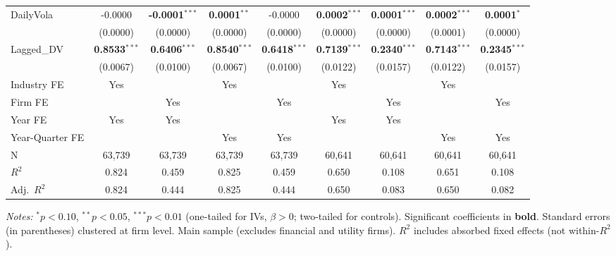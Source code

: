 \begin{landscape}
\begin{table}[H]
\begin{tabular}{lcccccccc}
DailyVola & -0.0000 & \textbf{-0.0001}$^{***}$ & \textbf{0.0001}$^{**}$ & -0.0000 & \textbf{0.0002}$^{***}$ & \textbf{0.0001}$^{***}$ & \textbf{0.0002}$^{***}$ & \textbf{0.0001}$^{*}$ \\
 & (0.0000) & (0.0000) & (0.0000) & (0.0000) & (0.0000) & (0.0000) & (0.0001) & (0.0000) \\
Lagged\_DV & \textbf{0.8533}$^{***}$ & \textbf{0.6406}$^{***}$ & \textbf{0.8540}$^{***}$ & \textbf{0.6418}$^{***}$ & \textbf{0.7139}$^{***}$ & \textbf{0.2340}$^{***}$ & \textbf{0.7143}$^{***}$ & \textbf{0.2345}$^{***}$ \\
 & (0.0067) & (0.0100) & (0.0067) & (0.0100) & (0.0122) & (0.0157) & (0.0122) & (0.0157) \\
\midrule
Industry FE & Yes &  & Yes &  & Yes &  & Yes &  \\
Firm FE &  & Yes &  & Yes &  & Yes &  & Yes \\
Year FE & Yes & Yes &  &  & Yes & Yes &  &  \\
Year-Quarter FE &  &  & Yes & Yes &  &  & Yes & Yes \\
\midrule
N & 63,739 & 63,739 & 63,739 & 63,739 & 60,641 & 60,641 & 60,641 & 60,641 \\
$R^2$ & 0.824 & 0.459 & 0.825 & 0.459 & 0.650 & 0.108 & 0.651 & 0.108 \\
Adj.~$R^2$ & 0.824 & 0.444 & 0.825 & 0.444 & 0.650 & 0.083 & 0.650 & 0.082 \\
\bottomrule
\end{tabular}
\begin{minipage}{\linewidth}
\vspace{2pt}\scriptsize
\textit{Notes:} $^{*}p<0.10$, $^{**}p<0.05$, $^{***}p<0.01$ (one-tailed for IVs, $\beta > 0$; two-tailed for controls).
 Significant coefficients in \textbf{bold}.
 Standard errors (in parentheses) clustered at firm level.
 Main sample (excludes financial and utility firms).
 $R^2$ includes absorbed fixed effects (not within-$R^2$).
\end{minipage}
\end{table}
\end{landscape}